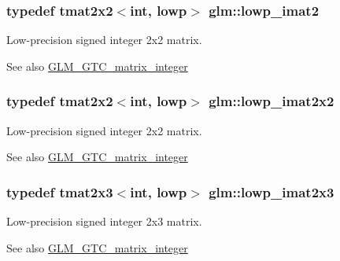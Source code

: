 \subsubsection[{lowp\+\_\+imat2}]{\setlength{\rightskip}{0pt plus 5cm}typedef tmat2x2$<$int, lowp$>$ {\bf glm\+::lowp\+\_\+imat2}}\label{group__gtc__matrix__integer_ga4840a4d8b9e8997f1173da9e8e5e4de4}
Low-\/precision signed integer 2x2 matrix. \begin{DoxySeeAlso}{See also}
\hyperlink{group__gtc__matrix__integer}{G\+L\+M\+\_\+\+G\+T\+C\+\_\+matrix\+\_\+integer} 
\end{DoxySeeAlso}
\hypertarget{group__gtc__matrix__integer_gad1950bd75bc033e8511cec3deb15af56}{}
\subsubsection[{lowp\+\_\+imat2x2}]{\setlength{\rightskip}{0pt plus 5cm}typedef tmat2x2$<$int, lowp$>$ {\bf glm\+::lowp\+\_\+imat2x2}}\label{group__gtc__matrix__integer_gad1950bd75bc033e8511cec3deb15af56}
Low-\/precision signed integer 2x2 matrix. \begin{DoxySeeAlso}{See also}
\hyperlink{group__gtc__matrix__integer}{G\+L\+M\+\_\+\+G\+T\+C\+\_\+matrix\+\_\+integer} 
\end{DoxySeeAlso}
\hypertarget{group__gtc__matrix__integer_ga00e00501dd9bf929e1dca7a167ba526b}{}
\subsubsection[{lowp\+\_\+imat2x3}]{\setlength{\rightskip}{0pt plus 5cm}typedef tmat2x3$<$int, lowp$>$ {\bf glm\+::lowp\+\_\+imat2x3}}\label{group__gtc__matrix__integer_ga00e00501dd9bf929e1dca7a167ba526b}
Low-\/precision signed integer 2x3 matrix. \begin{DoxySeeAlso}{See also}
\hyperlink{group__gtc__matrix__integer}{G\+L\+M\+\_\+\+G\+T\+C\+\_\+matrix\+\_\+integer} 
\end{DoxySeeAlso}
\hypertarget{group__gtc__matrix__integer_gaf664d339f1b66e62ed07c913e60be940}{}
